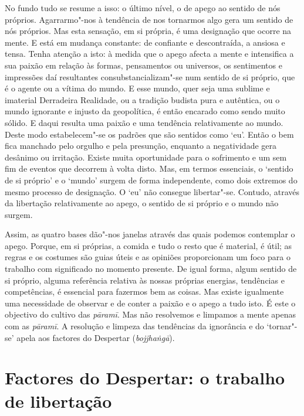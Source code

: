 No fundo tudo se resume a isso: o último nível, o de apego ao sentido de nós próprios. Agarrarmo"-nos à tendência de nos tornarmos algo gera um sentido de nós próprios. Mas esta sensação, em si própria, é uma designação que ocorre na mente. E está em mudança constante: de confiante e descontraída, a ansiosa e tensa. Tenha atenção a isto: à medida que o apego afecta a mente e intensifica a sua paixão em relação às formas, pensamentos ou universos, os sentimentos e impressões daí resultantes consubstancializam"-se num sentido de si próprio, que é o agente ou a vítima do mundo. E esse mundo, quer seja uma sublime e imaterial Derradeira Realidade, ou a tradição budista pura e autêntica, ou o mundo ignorante e injusto da geopolítica, é então encarado como sendo muito sólido. E daqui resulta uma paixão e uma tendência relativamente ao mundo. Deste modo estabelecem"-se os padrões que são sentidos como `eu'. Então o bem fica manchado pelo orgulho e pela presunção, enquanto a negatividade gera desânimo ou irritação. Existe muita oportunidade para o sofrimento e um sem fim de eventos que decorrem à volta disto. Mas, em termos essenciais, o `sentido de si próprio' e o `mundo' surgem de forma independente, como dois extremos do mesmo processo de designação. O `eu' não consegue libertar"-se. Contudo, através da libertação relativamente ao apego, o sentido de si próprio e o mundo não surgem.

Assim, as quatro bases dão"-nos janelas através das quais podemos contemplar o apego. Porque, em si próprias, a comida e tudo o resto que é material, é útil; as regras e os costumes são guias úteis e as opiniões proporcionam um foco para o trabalho com significado no momento presente. De igual forma, algum sentido de si próprio, alguma referência relativa às nossas próprias energias, tendências e competências, é essencial para fazermos bem as coisas. Mas existe igualmente uma necessidade de observar e de conter a paixão e o apego a tudo isto. É este o objectivo do cultivo das \emph{pāramī}. Mas não resolvemos e limpamos a mente apenas com as \emph{pāramī}. A resolução e limpeza das tendências da ignorância e do `tornar"-se' apela aos factores do Despertar (\emph{bojjhaṅgā}).

\section{Factores do Despertar: o trabalho de libertação}

